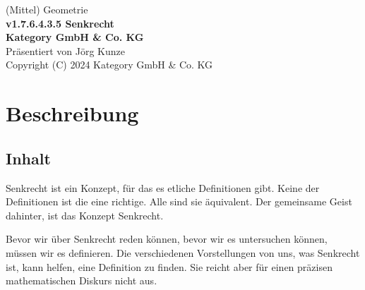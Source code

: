 \documentclass[a4paper]{amsart}
\theoremstyle{definition}
\begin{document}
\begin{titlepage}
\centering
{\huge
(Mittel) Geometrie\\[1cm]
\textbf{v1.7.6.4.3.5 Senkrecht}
}\\[1cm]

\textbf{Kategory GmbH \& Co. KG}\\
Präsentiert von Jörg Kunze\\
Copyright (C) 2024 Kategory GmbH \& Co. KG

\end{titlepage}

%

\newpage

\section*{Beschreibung}


\subsection*{Inhalt}
Senkrecht ist ein Konzept, für das es etliche Definitionen gibt. Keine der Definitionen ist die eine richtige. Alle sind sie äquivalent. Der gemeinsame Geist dahinter, ist das Konzept Senkrecht.

Bevor wir über Senkrecht reden können, bevor wir es untersuchen können, müssen wir es definieren. Die verschiedenen Vorstellungen von uns, was Senkrecht ist, kann helfen, eine Definition zu finden. Sie reicht aber für einen präzisen mathematischen Diskurs nicht aus.
\end{document}
